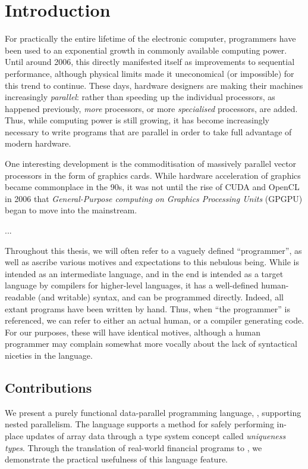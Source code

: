 \chapter{Introduction}

For practically the entire lifetime of the electronic computer,
programmers have been used to an exponential growth in commonly
available computing power.  Until around 2006, this directly
manifested itself as improvements to sequential performance, although
physical limits made it uneconomical (or impossible) for this trend to
continue.  These days, hardware designers are making their machines
increasingly \textit{parallel}: rather than speeding up the individual
processors, as happened previously, \textit{more} processors, or more
\textit{specialised} processors, are added.  Thus, while computing
power is still growing, it has become increasingly necessary to write
programs that are parallel in order to take full advantage of modern
hardware.

One interesting development is the commoditisation of massively
parallel vector processors in the form of graphics cards.  While
hardware acceleration of graphics became commonplace in the 90s, it
was not until the rise of CUDA and OpenCL in 2006 that
\textit{General-Purpose computing on Graphics Processing Units}
(GPGPU) began to move into the mainstream.

... 

Throughout this thesis, we will often refer to a vaguely defined
``programmer'', as well as ascribe various motives and expectations to
this nebulous being.  While \LO{} is intended as an intermediate
language, and in the end is intended as a target language by compilers
for higher-level languages, it has a well-defined human-readable (and
writable) syntax, and can be programmed directly.  Indeed, all extant
\LO{} programs have been written by hand.  Thus, when ``the
programmer'' is referenced, we can refer to either an actual human, or
a compiler generating \LO{} code.  For our purposes, these will have
identical motives, although a human programmer may complain somewhat
more vocally about the lack of syntactical niceties in the language.

\section{Contributions}

We present a purely functional data-parallel programming language,
\LO{}, supporting nested parallelism.  The language supports a method
for safely performing in-place updates of array data through a type
system concept called \textit{uniqueness types}.  Through the
translation of real-world financial programs to \LO{}, we demonstrate
the practical usefulness of this language feature.

